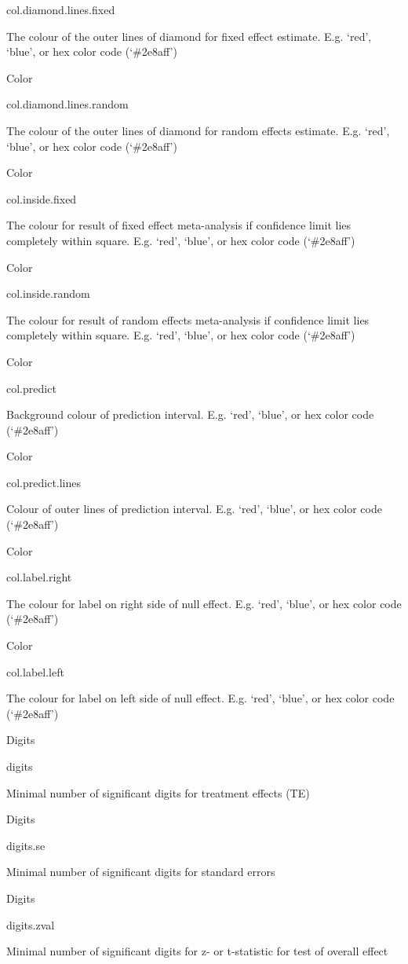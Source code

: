 \documentclass[]{book}
\begin{document}
col.diamond.lines.fixed

The colour of the outer lines of diamond for fixed effect estimate. E.g. `red', `blue', or hex color code (`\#2e8aff')

Color

col.diamond.lines.random

The colour of the outer lines of diamond for random effects estimate. E.g. `red', `blue', or hex color code (`\#2e8aff')

Color

col.inside.fixed

The colour for result of fixed effect meta-analysis if confidence limit lies completely within square. E.g. `red', `blue', or hex color code (`\#2e8aff')

Color

col.inside.random

The colour for result of random effects meta-analysis if confidence limit lies completely within square. E.g. `red', `blue', or hex color code (`\#2e8aff')

Color

col.predict

Background colour of prediction interval. E.g. `red', `blue', or hex color code (`\#2e8aff')

Color

col.predict.lines

Colour of outer lines of prediction interval. E.g. `red', `blue', or hex color code (`\#2e8aff')

Color

col.label.right

The colour for label on right side of null effect. E.g. `red', `blue', or hex color code (`\#2e8aff')

Color

col.label.left

The colour for label on left side of null effect. E.g. `red', `blue', or hex color code (`\#2e8aff')

Digits

digits

Minimal number of significant digits for treatment effects (TE)

Digits

digits.se

Minimal number of significant digits for standard errors

Digits

digits.zval

Minimal number of significant digits for z- or t-statistic for test of overall effect
\end{document}
